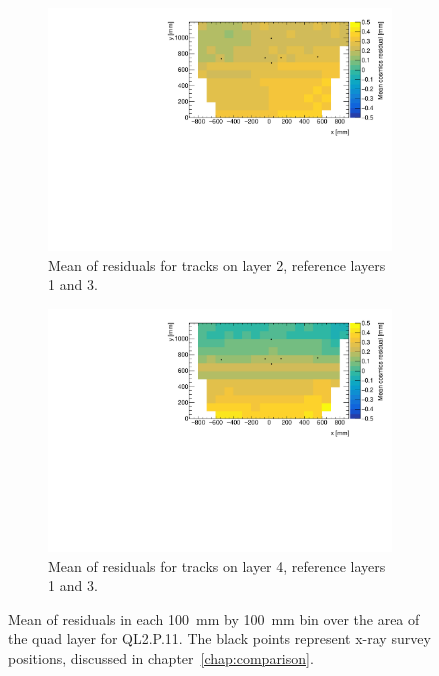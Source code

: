\begin{figure}
\centering
\begin{subfigure}{0.85\textwidth}
  \centering
  \includegraphics[width=\linewidth]{figures/figure_QL2P11_3100V_2021-08-05_fit_means_xray_overlay_layer2_fixedlayers13.pdf}
  \caption{Mean of residuals for tracks on layer 2, reference layers 1 and 3.}
  \label{fig:res_mean_th2_L2_F13}
\end{subfigure}%
\vspace*{\floatsep}
\begin{subfigure}{0.85\textwidth}
  \centering
  \includegraphics[width=\linewidth]{figures/figure_QL2P11_3100V_2021-08-05_fit_means_xray_overlay_layer4_fixedlayers13.pdf}
  \caption{Mean of residuals for tracks on layer 4, reference layers 1 and 3.}
  \label{fig:res_mean_th2_L4_F13}
\end{subfigure}
\caption{Mean of residuals in each \SI{100}{\milli\meter} by \SI{100}{\milli\meter} bin over the area of the quad layer for QL2.P.11. The black points represent x-ray survey positions, discussed in chapter~\ref{chap:comparison}.}
\label{fig:res_mean_th2}
\end{figure}

